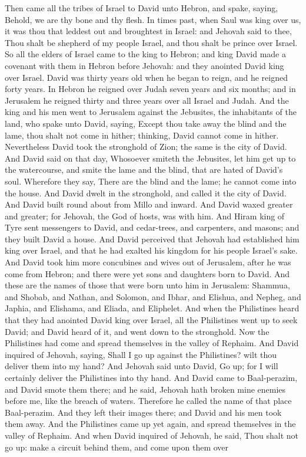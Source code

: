 Then came all the tribes of Israel to David unto Hebron, and spake, saying, Behold, we are thy bone and thy flesh. In times past, when Saul was king over us, it was thou that leddest out and broughtest in Israel: and Jehovah said to thee, Thou shalt be shepherd of my people Israel, and thou shalt be prince over Israel. So all the elders of Israel came to the king to Hebron; and king David made a covenant with them in Hebron before Jehovah: and they anointed David king over Israel. David was thirty years old when he began to reign, and he reigned forty years. In Hebron he reigned over Judah seven years and six months; and in Jerusalem he reigned thirty and three years over all Israel and Judah.  And the king and his men went to Jerusalem against the Jebusites, the inhabitants of the land, who spake unto David, saying, Except thou take away the blind and the lame, thou shalt not come in hither; thinking, David cannot come in hither. Nevertheless David took the stronghold of Zion; the same is the city of David. And David said on that day, Whosoever smiteth the Jebusites, let him get up to the watercourse, and smite the lame and the blind, that are hated of David’s soul. Wherefore they say, There are the blind and the lame; he cannot come into the house. And David dwelt in the stronghold, and called it the city of David. And David built round about from Millo and inward. And David waxed greater and greater; for Jehovah, the God of hosts, was with him.  And Hiram king of Tyre sent messengers to David, and cedar-trees, and carpenters, and masons; and they built David a house. And David perceived that Jehovah had established him king over Israel, and that he had exalted his kingdom for his people Israel’s sake.  And David took him more concubines and wives out of Jerusalem, after he was come from Hebron; and there were yet sons and daughters born to David. And these are the names of those that were born unto him in Jerusalem: Shammua, and Shobab, and Nathan, and Solomon, and Ibhar, and Elishua, and Nepheg, and Japhia, and Elishama, and Eliada, and Eliphelet.  And when the Philistines heard that they had anointed David king over Israel, all the Philistines went up to seek David; and David heard of it, and went down to the stronghold. Now the Philistines had come and spread themselves in the valley of Rephaim. And David inquired of Jehovah, saying, Shall I go up against the Philistines? wilt thou deliver them into my hand? And Jehovah said unto David, Go up; for I will certainly deliver the Philistines into thy hand. And David came to Baal-perazim, and David smote them there; and he said, Jehovah hath broken mine enemies before me, like the breach of waters. Therefore he called the name of that place Baal-perazim. And they left their images there; and David and his men took them away.  And the Philistines came up yet again, and spread themselves in the valley of Rephaim. And when David inquired of Jehovah, he said, Thou shalt not go up: make a circuit behind them, and come upon them over 